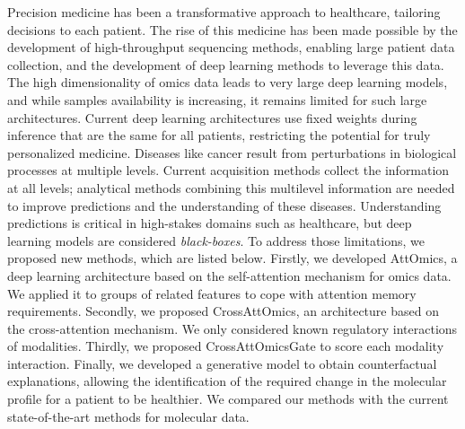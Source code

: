 Precision medicine has been a transformative approach to healthcare, tailoring decisions to each patient.
The rise of this medicine has been made possible by the development of high-throughput sequencing methods, enabling large patient data collection, and the development of deep learning methods to leverage this data.
The high dimensionality of omics data leads to very large deep learning models, and while samples availability is increasing, it remains limited for such large architectures.
Current deep learning architectures use fixed weights during inference that are the same for all patients, restricting the potential for truly personalized medicine.
Diseases like cancer result from perturbations in biological processes at multiple levels.
Current acquisition methods collect the information at all levels; analytical methods combining this multilevel information are needed to improve predictions and the understanding of these diseases.
Understanding predictions is critical in high-stakes domains such as healthcare, but deep learning models are considered \textit{black-boxes}.
To address those limitations, we proposed new methods, which are listed below.
Firstly, we developed AttOmics, a deep learning architecture based on the self-attention mechanism for omics data.
We applied it to groups of related features to cope with attention memory requirements.
Secondly, we proposed CrossAttOmics, an architecture based on the cross-attention mechanism.
We only considered known regulatory interactions of modalities.
Thirdly, we proposed CrossAttOmicsGate to score each modality interaction.
Finally, we developed a generative model to obtain counterfactual explanations, allowing the identification of the required change in the molecular profile for a patient to be healthier.
We compared our methods with the current state-of-the-art methods for molecular data.